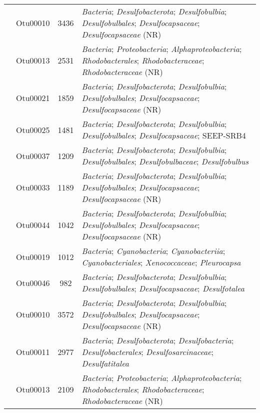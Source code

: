 \documentclass[
  12pt,
]{article}
\begin{document}
\begin{longtable}[t]{>{\centering\arraybackslash}m{8em}ccl}
\nopagebreak
 & Otu00010 & 3436 & \textit{Bacteria}; \textit{Desulfobacterota}; \textit{Desulfobulbia}; \textit{Desulfobulbales}; \textit{Desulfocapsaceae}; \textit{Desulfocapsaceae} (NR)\\
\nopagebreak
 & Otu00013 & 2531 & \textit{Bacteria}; \textit{Proteobacteria}; \textit{Alphaproteobacteria}; \textit{Rhodobacterales}; \textit{Rhodobacteraceae}; \textit{Rhodobacteraceae} (NR)\\
\nopagebreak
 & Otu00021 & 1859 & \textit{Bacteria}; \textit{Desulfobacterota}; \textit{Desulfobulbia}; \textit{Desulfobulbales}; \textit{Desulfocapsaceae}; \textit{Desulfocapsaceae} (NR)\\
\nopagebreak
 & Otu00025 & 1481 & \textit{Bacteria}; \textit{Desulfobacterota}; \textit{Desulfobulbia}; \textit{Desulfobulbales}; \textit{Desulfocapsaceae}; SEEP-SRB4\\
\nopagebreak
 & Otu00037 & 1209 & \textit{Bacteria}; \textit{Desulfobacterota}; \textit{Desulfobulbia}; \textit{Desulfobulbales}; \textit{Desulfobulbaceae}; \textit{Desulfobulbus}\\
\nopagebreak
 & Otu00033 & 1189 & \textit{Bacteria}; \textit{Desulfobacterota}; \textit{Desulfobulbia}; \textit{Desulfobulbales}; \textit{Desulfocapsaceae}; \textit{Desulfocapsaceae} (NR)\\
\nopagebreak
 & Otu00044 & 1042 & \textit{Bacteria}; \textit{Desulfobacterota}; \textit{Desulfobulbia}; \textit{Desulfobulbales}; \textit{Desulfocapsaceae}; \textit{Desulfocapsaceae} (NR)\\
\nopagebreak
 & Otu00019 & 1012 & \textit{Bacteria}; \textit{Cyanobacteria}; \textit{Cyanobacteriia}; \textit{Cyanobacteriales}; \textit{Xenococcaceae}; \textit{Pleurocapsa}\\
\nopagebreak
\multirow{-10}{8em}{\centering\arraybackslash \textit{Caulerpa cylindracea} (Mixed)} & Otu00046 & 982 & \textit{Bacteria}; \textit{Desulfobacterota}; \textit{Desulfobulbia}; \textit{Desulfobulbales}; \textit{Desulfocapsaceae}; \textit{Desulfotalea}\\
\cmidrule{1-4}\pagebreak[0]
 & Otu00010 & 3572 & \textit{Bacteria}; \textit{Desulfobacterota}; \textit{Desulfobulbia}; \textit{Desulfobulbales}; \textit{Desulfocapsaceae}; \textit{Desulfocapsaceae} (NR)\\
\nopagebreak
 & Otu00011 & 2977 & \textit{Bacteria}; \textit{Desulfobacterota}; \textit{Desulfobacteria}; \textit{Desulfobacterales}; \textit{Desulfosarcinaceae}; \textit{Desulfatitalea}\\
\nopagebreak
 & Otu00013 & 2109 & \textit{Bacteria}; \textit{Proteobacteria}; \textit{Alphaproteobacteria}; \textit{Rhodobacterales}; \textit{Rhodobacteraceae}; \textit{Rhodobacteraceae} (NR)\\

\end{longtable}
\end{document}
